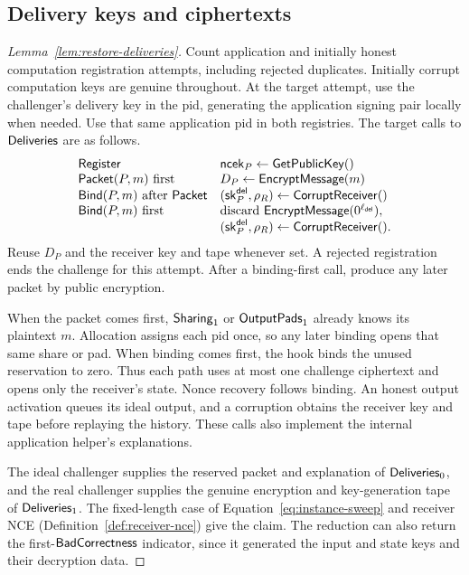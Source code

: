 \subsection{Delivery keys and ciphertexts}
\label{sec:deliveries-hybrid-proof}
\begin{proof}[Lemma~\ref{lem:restore-deliveries}]
Count application and initially honest computation registration attempts,
including rejected duplicates.  Initially corrupt computation keys are
genuine throughout.  At the target attempt, use the challenger's delivery
key in the pid, generating the application signing pair locally when needed.
Use that same application pid in both registries.  The target calls to
$\mathsf{Deliveries}$ are as follows.
\[
\begin{array}{@{}ll@{}}
 \Register & \ncek_P\gets\GetPublicKey()\\
 \Packet(P,m)\text{ first} & D_P\gets\EncryptMessage(m)\\
 \Bind(P,m)\text{ after }\Packet & (\sk^{\mathsf{del}}_P,\rho_R)\gets\CorruptReceiver()\\
 \Bind(P,m)\text{ first} & \text{discard }\EncryptMessage(0^{\ell_{\mathsf{del}}}),\\
                         & (\sk^{\mathsf{del}}_P,\rho_R)\gets\CorruptReceiver().
\end{array}
\]
Reuse $D_P$ and the receiver key and tape whenever set.  A rejected
registration ends the challenge for this attempt.
After a binding-first call, produce any later packet by public encryption.

When the packet comes first, $\mathsf{Sharing}_1$ or $\mathsf{OutputPads}_1$ already
knows its plaintext $m$.  Allocation assigns each pid once, so any later
binding opens that same share or pad.  When binding comes first, the hook
binds the unused reservation to zero.  Thus each path uses at most one challenge ciphertext and opens only
the receiver's state.  Nonce recovery follows
binding.  An honest output activation queues its ideal output, and a
corruption obtains the receiver key and tape before replaying the history.
These calls also implement the internal application helper's explanations.

The ideal challenger supplies the reserved packet and explanation of
$\mathsf{Deliveries}_0$, and the real challenger supplies the genuine encryption
and key-generation tape of $\mathsf{Deliveries}_1$.  The fixed-length case of
Equation~\eqref{eq:instance-sweep} and receiver NCE
(Definition~\ref{def:receiver-nce}) give the claim.
The reduction can also return the first-$\mathsf{BadCorrectness}$ indicator,
since it generated the input and state keys and their decryption data.
\end{proof}

